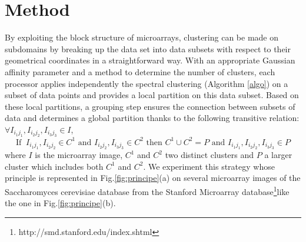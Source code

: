 \documentclass[]{svmult}
\begin{document}

\vspace{-0.5cm}
\section{Method} \label{method}
\vspace{-0.3cm}

By exploiting the block structure of microarrays, clustering can be made on
subdomains by breaking up the data set into data subsets with respect to their
geometrical coordinates in a straightforward way. With an appropriate Gaussian
affinity parameter and a method to determine the number of clusters, each
processor applies independently the spectral clustering (Algorithm \ref{algo})
on a subset of data points and provides a local partition on this data
subset.
Based on these local partitions, a grouping step ensures the connection
between subsets of data and determines a global partition thanks to the following transitive relation:
$\forall I_{i_1j_1}, I_{i_2j_2}, I_{i_3j_3} \in I$, 
\begin{equation}
\text{If } \ I_{i_1j_1}, I_{i_2j_2} \in C^1  \text{ and }   I_{i_2j_2}, I_{i_3j_3} \in C^2 \text{ then } 
 C^1 \cup C^2 = P \text{ and } I_{i_1j_1}, I_{i_2j_2}, I_{i_3j_3} \in P \label{reltrans}
\end{equation}
where $I$ is the microarray image, $C^1$ and $C^2$ two distinct clusters and
$P$ a larger cluster which includes both $C^1$ and $C^2$. We experiment this
strategy whose principle is represented in Fig.\ref{fig:principe}(a) on
several
microarray images of the Saccharomyces cerevisiae database from the Stanford
Microarray database\footnote{http://smd.stanford.edu/index.shtml}like the one
in Fig.\ref{fig:principe}(b).
\end{document}
